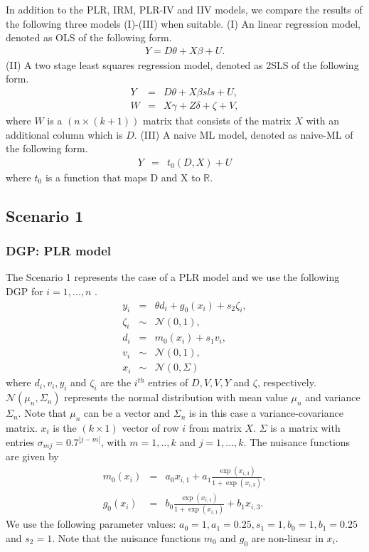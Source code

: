 \documentclass[10pt]{article}
\begin{document}
In addition to the PLR, IRM, PLR-IV and IIV models, we compare the results of the following three models (I)-(III) when suitable.
(I) An linear regression model, denoted as OLS of the following form. 
\begin{eqnarray*}\label{ols}
	Y= D \theta + X \beta + U.
\end{eqnarray*}
(II) A two stage least squares regression model, denoted as 2SLS of the following form. 
\begin{eqnarray*}\label{ols}
	Y &=& D \theta + X \beta sls+ U,\\
	W &=& X \gamma + Z \delta + \zeta + V,
\end{eqnarray*}
where $W$ is a $(n \times (k+1))$ matrix that consists of the matrix $X$ with an additional column which is $D$. 
(III) A naive ML model, denoted as naive-ML of the following form. 
\begin{eqnarray*}\label{ols}
	Y &=& t_0(D, X) + U
\end{eqnarray*}
where $t_0$ is a function that maps D and X to $\mathbb{R}$.



\subsection{Scenario 1}
\subsubsection{DGP: PLR model}
The Scenario 1 represents the case of a PLR model and we use the following DGP for $i=1,...,n$ \cite{Cher2018}.
\begin{eqnarray*}\label{dgp_1.1}
y_i &=& \theta d_i + g_0(x_i) + s_2 \zeta_i, \\
\zeta_i &\sim& \mathcal{N}(0,1),\\
d_i &=& m_0(x_i) + s_1 v_i, \\
v_i &\sim& \mathcal{N}(0,1),\\
x_i &\sim& \mathcal{N}(0, \Sigma)
\end{eqnarray*}
where $d_i, v_i, y_i$ and $\zeta_i$ are the $i^{th}$ entries of $D,V,V,Y$ and $\zeta$, respectively.
$ \mathcal{N}(\mu_n, \Sigma_n)$ represents the normal distribution with mean value $\mu_n$ and variance $\Sigma_n$.
Note that  $\mu_n$ can be a vector and $\Sigma_n$ is in this case a variance-covariance matrix.
$x_i$ is the $(k \times 1)$ vector of row $i$ from matrix $X$.
$\Sigma$ is a matrix with entries $\sigma_{mj} = 0.7^{|j-m|}$, with $m=1,..,k$ and $j=1,...,k$.
The nuisance functions are given by
\begin{eqnarray*}\label{dgp_1.2}
m_0(x_i) &=& a_0 x_{i,1} + a_1 \frac{\exp(x_{i,3})}{1+\exp(x_{i,3})},\\
g_0(x_i) &=& b_0 \frac{\exp(x_{i,1})}{1+\exp(x_{i,1})} + b_1 x_{i,3}.
\end{eqnarray*}
We use the following parameter values: $a_0=1, a_1=0.25, s_1=1, b_0=1, b_1=0.25$ and $s_2=1$.
Note that the nuisance functions $m_0$ and $g_0$ are non-linear in $x_i$.
\end{document}
